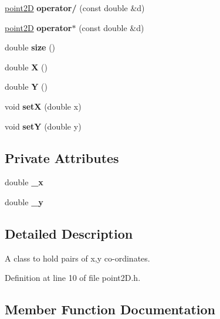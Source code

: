 \begin{DoxyCompactItemize}
\mbox{\hyperlink{classpoint2D}{point2D}} {\bfseries operator/} (const double \&d)
\item 
\mbox{\label{classpoint2D_a99f2c435a66f29b578cfbe038e3b0a4f}} 
\mbox{\hyperlink{classpoint2D}{point2D}} {\bfseries operator$\ast$} (const double \&d)
\item 
\mbox{\label{classpoint2D_ae51e5cac280000178e5e1f195a0d261e}} 
double {\bfseries size} ()
\item 
\mbox{\label{classpoint2D_ab717752f9e06193ef1adf96b87032c30}} 
double {\bfseries X} ()
\item 
\mbox{\label{classpoint2D_a9d1539ce321a5b2d61b4a3491b0b7523}} 
double {\bfseries Y} ()
\item 
\mbox{\label{classpoint2D_ade4a0546d017a00679edea6957eabac5}} 
void {\bfseries setX} (double x)
\item 
\mbox{\label{classpoint2D_a04986e0319731de9db422a3b1fb89fd4}} 
void {\bfseries setY} (double y)
\end{DoxyCompactItemize}
\subsection*{Private Attributes}
\begin{DoxyCompactItemize}
\item 
\mbox{\label{classpoint2D_a088847e0f65d198d910fe142904be506}} 
double {\bfseries \+\_\+x}
\item 
\mbox{\label{classpoint2D_ae4bb4390fa55e344388605e26d63f07c}} 
double {\bfseries \+\_\+y}
\end{DoxyCompactItemize}


\subsection{Detailed Description}
A class to hold pairs of x,y co-\/ordinates. 

Definition at line 10 of file point2\+D.\+h.



\subsection{Member Function Documentation}
\mbox{\label{classpoint2D_a34b676d196277da05f03e87dc2f88288}} 
